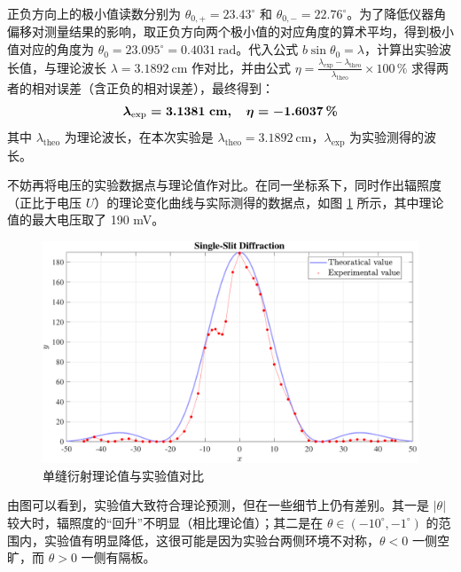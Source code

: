 \documentclass[UTF8]{article}
\theoremstyle{MyLineTheoremStyle} %
\theoremstyle{MyBlockTheoremStyle} %
\theoremstyle{MySubsubsectionStyle} %
\begin{document}
正负方向上的极小值读数分别为 $\theta_{0, +} = 23.43^\circ $ 和 $\theta_{0, -} = 22.76^\circ $。为了降低仪器角偏移对测量结果的影响，取正负方向两个极小值的对应角度的算术平均，得到极小值对应的角度为 $\theta_0 = 23.095^\circ = 0.4031 \ \mathrm{rad}$。代入公式 $b \sin \theta_0 = \lambda$，计算出实验波长值，与理论波长 $\lambda = 3.1892 \ \mathrm{cm}$ 作对比，并由公式 $\eta  = \frac{\lambda_{\text{exp}} - \lambda_{\text{theo}}}{\lambda_{\text{theo}}}\times 100\, \%$ 求得两者的相对误差（含正负的相对误差），最终得到：
\begin{equation}\boldmath
    \lambda_{\text{exp}} = 3.1381 \ \mathrm{cm},\quad \eta = - 1.6037\, \%
\end{equation}
其中 $\lambda_{\text{theo}}$ 为理论波长，在本次实验是 $\lambda_{\text{theo}} = 3.1892 \ \mathrm{cm}$，$\lambda_{\text{exp}}$ 为实验测得的波长。





不妨再将电压的实验数据点与理论值作对比。在同一坐标系下，同时作出辐照度（正比于电压 $U$）的理论变化曲线与实际测得的数据点，如图 \ref{单缝对比} 所示，其中理论值的最大电压取了 190 mV。
\begin{figure}[H]\centering
    \includegraphics[width=\columnwidth]{assets/1 单缝/单缝 对比.pdf}
    \caption{单缝衍射理论值与实验值对比}\label{单缝对比}
\end{figure}
由图可以看到，实验值大致符合理论预测，但在一些细节上仍有差别。其一是 $\left| \theta \right| $ 较大时，辐照度的“回升”不明显（相比理论值）；其二是在 $\theta \in (-10^\circ, -1^\circ)$ 的范围内，实验值有明显降低，这很可能是因为实验台两侧环境不对称，$\theta < 0$ 一侧空旷，而 $\theta > 0$ 一侧有隔板。
\end{document}
